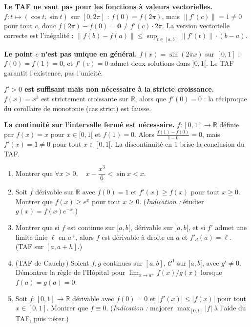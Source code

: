 \begin{mdframed}[style=cexbar]
  \textbf{Le TAF ne vaut pas pour les fonctions à valeurs vectorielles.}\enspace%
  $f : t \mapsto (\cos t, \sin t)$ sur $[0, 2\pi]$ : $f(0)=f(2\pi)$,
  mais $\|f'(c)\| = 1 \neq 0$ pour tout $c$, donc $f(2\pi)-f(0) = \mathbf{0} \neq f'(c)\cdot 2\pi$.
  La version vectorielle correcte est l'inégalité : $\|f(b)-f(a)\| \leq \sup_{t\in[a,b]}\|f'(t)\|\cdot(b-a)$.

  \smallskip\noindent
  \textbf{Le point $c$ n'est pas unique en général.}\enspace%
  $f(x) = \sin(2\pi x)$ sur $[0,1]$ : $f(0)=f(1)=0$, et $f'(c)=0$ admet
  deux solutions dans $]0,1[$. Le TAF garantit l'existence, pas l'unicité.

  \smallskip\noindent
  \textbf{$f'>0$ est suffisant mais non nécessaire à la stricte croissance.}\enspace%
  $f(x)=x^3$ est strictement croissante sur $\mathbb{R}$, alors que $f'(0)=0$ :
  la réciproque du corollaire de monotonie (cas strict) est fausse.

  \smallskip\noindent
  \textbf{La continuité sur l'intervalle fermé est nécessaire.}\enspace%
  $f : [0,1]\to\mathbb{R}$ définie par $f(x)=x$ pour $x\in[0,1[$ et $f(1)=0$.
  Alors $\frac{f(1)-f(0)}{1-0}=0$, mais $f'(x)=1\neq 0$ pour tout $x\in\,]0,1[$.
  La discontinuité en $1$ brise la conclusion du TAF.
\end{mdframed}

\vspace{6pt}
\exolabel

\begin{mdframed}[style=exobar]
  \begin{enumerate}
    \item Montrer que $\forall x > 0,\quad x - \dfrac{x^3}{6} < \sin x < x$.

    \item Soit $f$ dérivable sur $\mathbb{R}$ avec $f(0)=1$ et $f'(x) \geq f(x)$
          pour tout $x\geq 0$. Montrer que $f(x) \geq e^x$ pour tout $x \geq 0$.
          (\textit{Indication :} étudier $g(x)=f(x)e^{-x}$.)

    \item Montrer que si $f$ est continue sur $[a,b[$, dérivable sur $]a,b[$,
          et si $f'$ admet une
          limite finie $\ell$ en $a^+$, alors $f$ est dérivable à droite en $a$
          et $f'_d(a)=\ell$. (TAF sur $[a, a+h]$.)

    \item (TAF de Cauchy) Soient $f,g$ continues sur $[a,b]$, $\mathcal{C}^1$ sur
          $]a,b[$, avec $g'\neq 0$. Démontrer la règle de l'Hôpital pour
          $\lim_{x\to a^+} f(x)/g(x)$ lorsque $f(a)=g(a)=0$.

    \item Soit $f : [0,1]\to\mathbb{R}$ dérivable avec $f(0)=0$ et $|f'(x)|\leq |f(x)|$
          pour tout $x\in[0,1]$. Montrer que $f\equiv 0$.
          (\textit{Indication :} majorer $\max_{[0,t]}|f|$ à l'aide du TAF, puis itérer.)
  \end{enumerate}
\end{mdframed}

